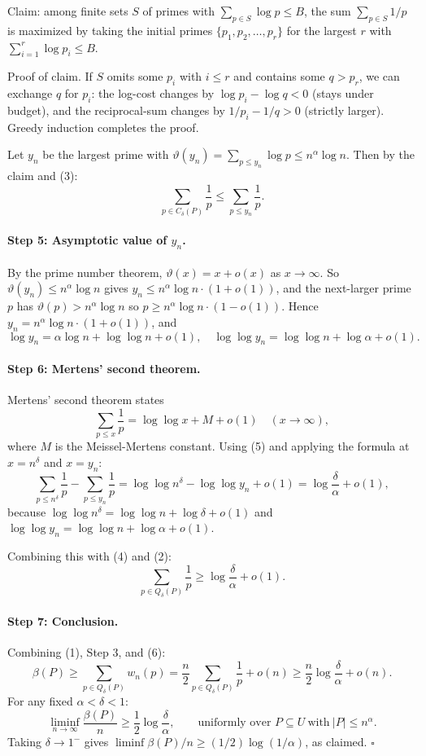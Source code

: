 \documentclass{article}
\begin{document}
Claim: among finite sets $S$ of primes with $\sum_{p \in S} \log p \le B$, the sum $\sum_{p \in S} 1/p$ is maximized by taking the initial primes $\{p_1, p_2, \ldots, p_r\}$ for the largest $r$ with $\sum_{i=1}^r \log p_i \le B$.

Proof of claim. If $S$ omits some $p_i$ with $i \le r$ and contains some $q > p_r$, we can exchange $q$ for $p_i$: the log-cost changes by $\log p_i - \log q < 0$ (stays under budget), and the reciprocal-sum changes by $1/p_i - 1/q > 0$ (strictly larger). Greedy induction completes the proof.

Let $y_n$ be the largest prime with $\vartheta(y_n) = \sum_{p \le y_n} \log p \le n^\alpha \log n$. Then by the claim and (3):
\[\sum_{p \in C_\delta(P)} \frac{1}{p} \le \sum_{p \le y_n} \frac{1}{p}. \tag{4}\]

\paragraph{Step 5: Asymptotic value of $y_n$.}
By the prime number theorem, $\vartheta(x) = x + o(x)$ as $x \to \infty$. So $\vartheta(y_n) \le n^\alpha \log n$ gives $y_n \le n^\alpha \log n \cdot (1 + o(1))$, and the next-larger prime $p$ has $\vartheta(p) > n^\alpha \log n$ so $p \ge n^\alpha \log n \cdot (1-o(1))$. Hence $y_n = n^\alpha \log n \cdot (1 + o(1))$, and
\[\log y_n = \alpha \log n + \log\log n + o(1), \quad \log \log y_n = \log \log n + \log \alpha + o(1). \tag{5}\]

\paragraph{Step 6: Mertens' second theorem.}
Mertens' second theorem states
\[\sum_{p \le x} \frac{1}{p} = \log \log x + M + o(1) \quad (x \to \infty),\]
where $M$ is the Meissel-Mertens constant. Using (5) and applying the formula at $x = n^\delta$ and $x = y_n$:
\[\sum_{p \le n^\delta} \frac{1}{p} - \sum_{p \le y_n} \frac{1}{p} = \log \log n^\delta - \log \log y_n + o(1) = \log \frac{\delta}{\alpha} + o(1),\]
because $\log \log n^\delta = \log \log n + \log \delta + o(1)$ and $\log \log y_n = \log \log n + \log \alpha + o(1)$.

Combining this with (4) and (2):
\[\sum_{p \in Q_\delta(P)} \frac{1}{p} \ge \log \frac{\delta}{\alpha} + o(1). \tag{6}\]

\paragraph{Step 7: Conclusion.}
Combining (1), Step 3, and (6):
\[\beta(P) \ge \sum_{p \in Q_\delta(P)} w_n(p) = \frac{n}{2} \sum_{p \in Q_\delta(P)} \frac{1}{p} + o(n) \ge \frac{n}{2} \log \frac{\delta}{\alpha} + o(n).\]
For any fixed $\alpha < \delta < 1$:
\[\liminf_{n \to \infty} \frac{\beta(P)}{n} \ge \frac{1}{2} \log \frac{\delta}{\alpha}, \qquad \text{uniformly over } P \subseteq U\ \text{with}\ |P| \le n^\alpha.\]
Taking $\delta \to 1^-$ gives $\liminf \beta(P)/n \ge (1/2)\log(1/\alpha)$, as claimed. $\square$
\end{document}
